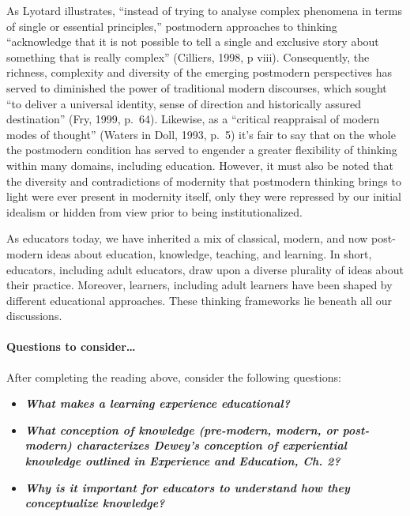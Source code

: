 \documentclass[
]{book}
\providecommand{\tightlist}{%
  \setlength{\itemsep}{0pt}\setlength{\parskip}{0pt}}
\begin{document}
As Lyotard illustrates, ``instead of trying to analyse complex phenomena in terms of single or essential principles,'' postmodern approaches to thinking ``acknowledge that it is not possible to tell a single and exclusive story about something that is really complex'' (Cilliers, 1998, p viii). Consequently, the richness, complexity and diversity of the emerging postmodern perspectives has served to diminished the power of traditional modern discourses, which sought ``to deliver a universal identity, sense of direction and historically assured destination'' (Fry, 1999, p.~64). Likewise, as a ``critical reappraisal of modern modes of thought'' (Waters in Doll, 1993, p.~5) it's fair to say that on the whole the postmodern condition has served to engender a greater flexibility of thinking within many domains, including education. However, it must also be noted that the diversity and contradictions of modernity that postmodern thinking brings to light were ever present in modernity itself, only they were repressed by our initial idealism or hidden from view prior to being institutionalized.

As educators today, we have inherited a mix of classical, modern, and now post-modern ideas about education, knowledge, teaching, and learning. In short, educators, including adult educators, draw upon a diverse plurality of ideas about their practice. Moreover, learners, including adult learners have been shaped by different educational approaches. These thinking frameworks lie beneath all our discussions.

\begin{reflect}
\hypertarget{questions-to-consider}{%
\paragraph*{Questions to consider\ldots{}}\label{questions-to-consider}}

After completing the reading above, consider the following questions:

\begin{itemize}
\tightlist
\item
  \textbf{\emph{What makes a learning experience educational?}}\\
\item
  \textbf{\emph{What conception of knowledge (pre-modern, modern, or
  post-modern) characterizes Dewey's conception of experiential
  knowledge outlined in Experience and Education, Ch. 2?}}\\
\item
  \textbf{\emph{Why is it important for educators to understand how they
  conceptualize knowledge?}}
\end{itemize}
\end{reflect}
\end{document}
